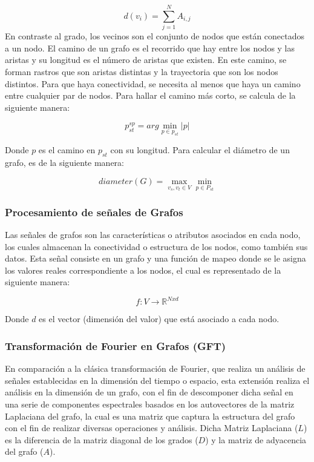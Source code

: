 \begin{equation} 
	d(v_{i}) = \sum_{j = 1}^{N}A_{i,j}
\end{equation}
En contraste al grado, los vecinos son el conjunto de nodos que están conectados a un nodo. El camino de un grafo es el recorrido que hay entre los nodos y las aristas y su longitud es el número de aristas que existen. En este camino, se forman rastros que son aristas distintas y la trayectoria que son los nodos distintos. Para que haya conectividad, se necesita al menos que haya un camino entre cualquier par de nodos. Para hallar el camino más corto, se calcula de la siguiente manera:

\begin{equation}
	p_{st}^{sp} = arg \min_{p\in p_{st}}\left | p \right |
\end{equation}

Donde $p$ es el camino en $p_{st}$ con su longitud.
Para calcular el diámetro de un grafo, es de la siguiente manera:

\begin{equation}
	diameter(G) = \max_{v_{s},v_{t}\in V}\min_{p\in P_{st}}
\end{equation}


\subsubsection{Procesamiento de señales de Grafos \parencite{bk_grafo}}

Las señales de grafos son las características o atributos asociados en cada nodo, los cuales almacenan la conectividad o estructura de los nodos, como también sus datos. Esta señal consiste en un grafo y una función de mapeo donde se le asigna los valores reales correspondiente a los nodos, el cual es representado de la siguiente manera:

\begin{equation}
	f: V \rightarrow \mathbb{R}^{Nxd}
\end{equation}

Donde $d$ es el vector (dimensión del valor) que está asociado a cada nodo.


\subsubsection{Transformación de Fourier en Grafos (GFT) \parencite{bk_grafo}}
En comparación a la clásica transformación de Fourier, que realiza un análisis de señales establecidas en la dimensión del tiempo o espacio, esta extensión realiza el análisis en la dimensión de un grafo, con el fin de descomponer dicha señal en una serie de componentes espectrales basados en los autovectores de la matriz Laplaciana del grafo, la cual es una matriz que captura la estructura del grafo con el fin de realizar diversas operaciones y análisis. Dicha Matriz Laplaciana ($L$) es la diferencia de la matriz diagonal de los grados ($D$) y la matriz de adyacencia del grafo ($A$). 

